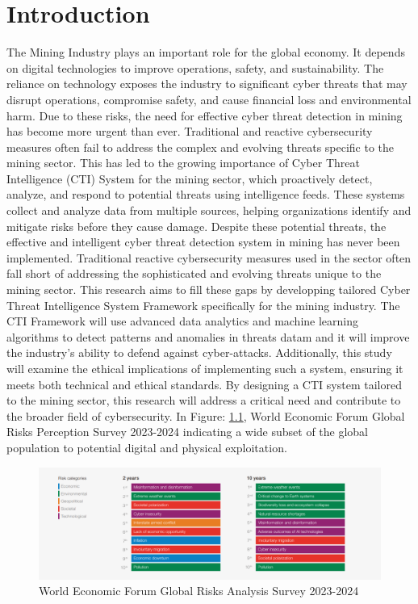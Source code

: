 \documentclass[a4paper,twoside,12pt]{report}
\begin{document}
\chapter{Introduction}
The Mining Industry plays an important role for the global economy. It depends on digital technologies to improve operations, safety, and sustainability. The reliance on technology exposes the industry to significant cyber threats that may disrupt operations, compromise safety, and cause financial loss and environmental harm. Due to these risks, the need for effective cyber threat detection in mining has become more urgent than ever. Traditional and reactive cybersecurity measures often fail to address the complex and evolving threats specific to the mining sector. This has led to the growing importance of Cyber Threat Intelligence (CTI) System for the mining sector, which proactively detect, analyze, and respond to potential threats using intelligence feeds. These systems collect and analyze data from multiple sources, helping organizations identify and mitigate risks before they cause damage. Despite these potential threats, the effective and intelligent cyber threat detection system in mining has never been implemented. Traditional reactive cybersecurity measures used in the sector often fall short of addressing the sophisticated and evolving threats unique to the mining sector. This research aims to fill these gaps by developping tailored Cyber Threat Intelligence System Framework specifically for the mining industry. The CTI Framework will use advanced data analytics and machine learning algorithms to detect patterns and anomalies in threats datam and it will improve the industry’s ability to defend against cyber-attacks. Additionally, this study will examine the ethical implications of implementing such a system, ensuring it meets both technical and ethical standards. By designing a CTI system tailored to the mining sector, this research will address a critical need and contribute to the broader field of cybersecurity. In Figure: \ref{fig:thing11}, World Economic Forum Global Risks Perception Survey 2023-2024 indicating a wide subset of the global population to potential digital and physical exploitation.

\begin{figure}[ht]
    \centering
    \includegraphics[width=1.0\linewidth]{images/world-economic-forum-global-risks.png}  %
    \caption{World Economic Forum Global Risks Analysis Survey 2023-2024}
    \label{fig:thing11}
\end{figure}
\end{document}
